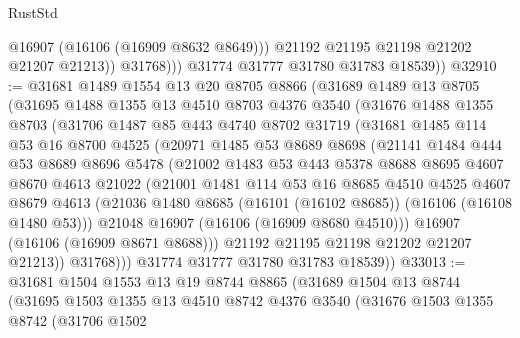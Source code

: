 \begin{lexlean}{RustStd}
\begin{coremodule}
                    @16907
                    (@16106 (@16909 @8632 @8649)))
                  @21192
                  @21195
                  @21198
                  @21202
                  @21207
                  @21213))
              @31768)))
        @31774
        @31777
        @31780
        @31783
        @18539))
@32910 := @31681
    @1489
    @1554
    @13
    @20
    @8705
    @8866
    (@31689
      @1489
      @13
      @8705
      (@31695
        @1488
        @1355
        @13
        @4510
        @8703
        @4376
        @3540
        (@31676
          @1488
          @1355
          @8703
          (@31706
            @1487
            @85
            @443
            @4740
            @8702
            @31719
            (@31681
              @1485
              @114
              @53
              @16
              @8700
              @4525
              (@20971
                @1485
                @53
                @8689
                @8698
                (@21141
                  @1484
                  @444
                  @53
                  @8689
                  @8696
                  @5478
                  (@21002
                    @1483
                    @53
                    @443
                    @5378
                    @8688
                    @8695
                    @4607
                    @8670
                    @4613
                    @21022
                    (@21001
                      @1481
                      @114
                      @53
                      @16
                      @8685
                      @4510
                      @4525
                      @4607
                      @8679
                      @4613
                      (@21036 @1480 @8685 (@16101 (@16102 @8685)) (@16106 (@16108 @1480 @53)))
                      @21048
                      @16907
                      (@16106 (@16909 @8680 @4510)))
                    @16907
                    (@16106 (@16909 @8671 @8688)))
                  @21192
                  @21195
                  @21198
                  @21202
                  @21207
                  @21213))
              @31768)))
        @31774
        @31777
        @31780
        @31783
        @18539))
@33013 := @31681
    @1504
    @1553
    @13
    @19
    @8744
    @8865
    (@31689
      @1504
      @13
      @8744
      (@31695
        @1503
        @1355
        @13
        @4510
        @8742
        @4376
        @3540
        (@31676
          @1503
          @1355
          @8742
          (@31706
            @1502

\end{coremodule}
\end{lexlean}
